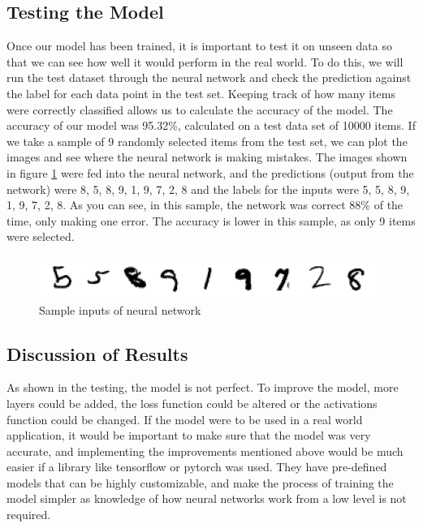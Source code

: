 \documentclass[titlepage]{article}
\begin{document}
\subsection{Testing the Model}
Once our model has been trained, it is important to test it on unseen data so that we can see how well it would perform in the real world. To do this, we will run the test dataset through the neural network and check the prediction against the label for each data point in the test set. Keeping track of how many items were correctly classified allows us to calculate the accuracy of the model. The accuracy of our model was 95.32\%, calculated on a test data set of 10000 items. If we take a sample of 9 randomly selected items from the test set, we can plot the images and see where the neural network is making mistakes. The images shown in figure \ref{fig:sample-predictions} were fed into the neural network, and the predictions (output from the network) were 8, 5, 8, 9, 1, 9, 7, 2, 8 and the labels for the inputs were 5, 5, 8, 9, 1, 9, 7, 2, 8. As you can see, in this sample, the network was correct 88\% of the time, only making one error. The accuracy is lower in this sample, as only 9 items were selected.
\begin{figure}[h!]
    \includegraphics[width=\linewidth]{assets/sample_predictions.png}
    \caption{Sample inputs of neural network}
    \label{fig:sample-predictions}
\end{figure}
 
\subsection{Discussion of Results}
As shown in the testing, the model is not perfect. To improve the model, more layers could be added, the loss function could be altered or the activations function could be changed. If the model were to be used in a real world application, it would be important to make sure that the model was very accurate, and implementing the improvements mentioned above would be much easier if a library like tensorflow\cite{tensorflow} or pytorch\cite{pytorch} was used. They have pre-defined models that can be highly customizable, and make the process of training the model simpler as knowledge of how neural networks work from a low level is not required. 
\newpage
\end{document}
